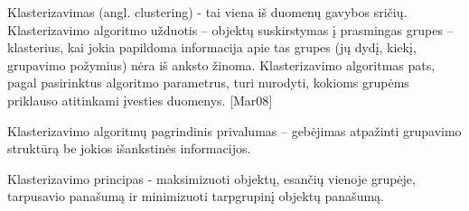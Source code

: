 Klasterizavimas (angl.  clustering) - tai viena iš duomenų gavybos sričių. Klasterizavimo 
algoritmo užduotis – objektų suskirstymas  į prasmingas grupes – klasterius, kai jokia papildoma 
informacija apie tas grupes (jų dydį, kiekį, grupavimo požymius) nėra iš anksto žinoma. 
Klasterizavimo algoritmas pats, pagal pasirinktus algoritmo parametrus, turi nurodyti, kokioms 
grupėms priklauso atitinkami įvesties duomenys. [Mar08]  

Klasterizavimo algoritmų pagrindinis privalumas – gebėjimas atpažinti grupavimo
struktūrą be jokios išankstinės informacijos.  

Klasterizavimo principas - maksimizuoti objektų, esančių vienoje grupėje,
tarpusavio panašumą ir minimizuoti tarpgrupinį objektų panašumą.
